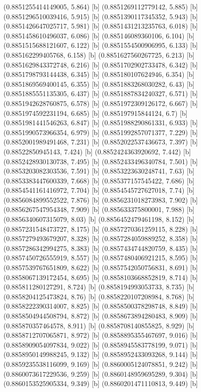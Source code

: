 {{{(0.8851255414149005, 5.864) [b] 
(0.8851269112779142, 5.885) [b] 
(0.8851296510039416, 5.915) [b] 
(0.8851390117345352, 5.943) [b] 
(0.8851426647025717, 5.981) [b] 
(0.8851431213235763, 6.018) [b] 
(0.8851458610496037, 6.086) [b] 
(0.885146089360106, 6.104) [b] 
(0.8851515688121607, 6.122) [b] 
(0.8851554500906995, 6.133) [b] 
(0.885162299405768, 6.158) [b] 
(0.8851627560267725, 6.213) [b] 
(0.8851629843372748, 6.216) [b] 
(0.8851702902733478, 6.342) [b] 
(0.8851798793144438, 6.345) [b] 
(0.885180107624946, 6.354) [b] 
(0.8851869569400145, 6.355) [b] 
(0.8851883268030282, 6.43) [b] 
(0.8851885551135305, 6.437) [b] 
(0.8851887834240327, 6.571) [b] 
(0.8851942628760875, 6.578) [b] 
(0.8851972309126172, 6.667) [b] 
(0.8851974592231194, 6.685) [b] 
(0.885197915844124, 6.7) [b] 
(0.8851981441546263, 6.847) [b] 
(0.8851988290861331, 6.933) [b] 
(0.8851990573966354, 6.979) [b] 
(0.8851992857071377, 7.229) [b] 
(0.8852001989491468, 7.231) [b] 
(0.8852022537436673, 7.397) [b] 
(0.88522850945143, 7.424) [b] 
(0.8852424363920692, 7.442) [b] 
(0.8852428930130738, 7.495) [b] 
(0.8852433496340784, 7.501) [b] 
(0.8853203082303536, 7.591) [b] 
(0.8853223630248741, 7.63) [b] 
(0.8853383447600339, 7.668) [b] 
(0.885377157545422, 7.686) [b] 
(0.8854541161416972, 7.704) [b] 
(0.8854545727627018, 7.74) [b] 
(0.8856084899552522, 7.876) [b] 
(0.8856231018273983, 7.902) [b] 
(0.8856267547954348, 7.909) [b] 
(0.885633375800001, 7.988) [b] 
(0.8856340607315079, 8.03) [b] 
(0.8856452479461198, 8.152) [b] 
(0.8857231548473727, 8.175) [b] 
(0.8857270361259115, 8.228) [b] 
(0.8857279493679207, 8.328) [b] 
(0.8857284059889252, 8.358) [b] 
(0.8857286342994275, 8.383) [b] 
(0.8857434744820759, 8.435) [b] 
(0.8857450726555919, 8.557) [b] 
(0.8857480406921215, 8.595) [b] 
(0.8857539767651809, 8.622) [b] 
(0.8857542050756831, 8.691) [b] 
(0.8858067139172454, 8.695) [b] 
(0.8858103668852819, 8.714) [b] 
(0.885811280127291, 8.724) [b] 
(0.8858194993053733, 8.735) [b] 
(0.8858204125473824, 8.76) [b] 
(0.8858220107208984, 8.768) [b] 
(0.8858222390314007, 8.825) [b] 
(0.8858500378298748, 8.849) [b] 
(0.8858504944508794, 8.872) [b] 
(0.8858673894280483, 8.909) [b] 
(0.885870357464578, 8.911) [b] 
(0.8858708140855825, 8.929) [b] 
(0.8858712707065871, 8.972) [b] 
(0.8858895355467697, 9.016) [b] 
(0.8858909054097834, 9.022) [b] 
(0.8858945583778199, 9.071) [b] 
(0.8858950149988245, 9.132) [b] 
(0.8858952433093268, 9.144) [b] 
(0.8859235538116099, 9.169) [b] 
(0.8860005124078851, 9.242) [b] 
(0.8860073617229536, 9.259) [b] 
(0.8860148959695289, 9.304) [b] 
(0.8860153525905334, 9.349) [b] 
(0.8860201471110813, 9.449) [b] 
}}}
